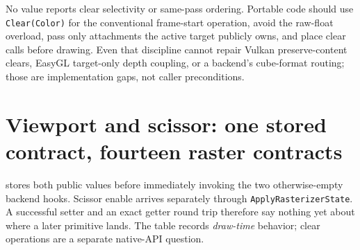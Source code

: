 No  value reports clear selectivity or same-pass ordering.
Portable code should use \texttt{Clear(Color)} for the conventional frame-start operation,
avoid the raw-float overload, pass only attachments the active target publicly owns, and place
clear calls before drawing. Even that discipline cannot repair Vulkan preserve-content clears,
EasyGL target-only depth coupling, or a backend's cube-format routing; those are implementation
gaps, not caller preconditions.

\section{Viewport and scissor: one stored contract, fourteen raster contracts}
\label{sec:backend-viewport-scissor-matrix}

 stores both public values before immediately invoking the two
otherwise-empty backend hooks. Scissor enable arrives separately through
\texttt{ApplyRasterizerState}. A successful setter and an exact getter round trip therefore say
nothing yet about where a later primitive lands. The table records \emph{draw-time} behavior;
clear operations are a separate native-API question.

